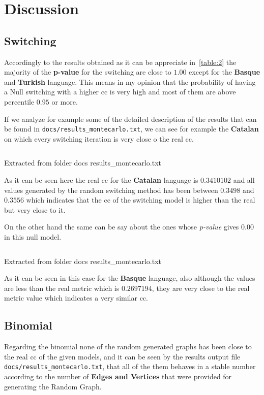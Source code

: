 \documentclass[12pt, a4paper]{article}
\begin{document}
\section{Discussion}
\subsection{Switching}
Accordingly to the results obtained as it can be appreciate in~\ref{table:2} the majority of the \textbf{p-value} for the 
\acrshort{switching} are close to $1.00$ except for the \textbf{Basque} and \textbf{Turkish} language. This means in my opinion that 
the probability of having a Null \acrshort{switching} with a higher \acrshort{cc} is very high and most of them are above percentile $0.95$ or more.

If we analyze for example some of the detailed description of the results that can be found in \texttt{docs/results_montecarlo.txt},
we can see for example the \textbf{Catalan} on which every switching iteration is very close o the real \acrshort{cc}.

\begin{listing}[H]
    \inputminted[firstline=58, lastline=78, breaklines]{bash}{./results_montecarlo.txt}
    \caption{Extracted from folder docs results\_montecarlo.txt}
    \label{apx:results:1}
\end{listing}  

As it can be seen here the real \acrshort{cc} for the \textbf{Catalan} language is \textbf{$0.3410102$}
and all values generated by the random switching method has been between $0.3498$ and $0.3556$ which indicates that
the \acrshort{cc} of the \acrshort{switching} model is higher than the real but very close to it.

On the other hand the same can be say about the ones whose \textit{p-value} gives $0.00$ in this null model.

\begin{listing}[H]
    \inputminted[firstline=12, lastline=32, breaklines]{bash}{./results_montecarlo.txt}
    \caption{Extracted from folder docs results\_montecarlo.txt}
    \label{apx:results:2}
\end{listing}  

As it can be seen in this case for the \textbf{Basque} language, also although the values are less than the real metric which is $0.2697194$,
they are very close to the real metric value which indicates a very similar \acrshort{cc}.

\subsection{Binomial}
Regarding the \acrshort{binomial} none of the random generated graphs has been close to the real \acrshort{cc} of the given models,
and it can be seen by the results output file \texttt{docs/results_montecarlo.txt}, that all of the them behaves in a stable number according to the 
number of \textbf{Edges and Vertices} that were provided for generating the Random Graph.
\end{document}
